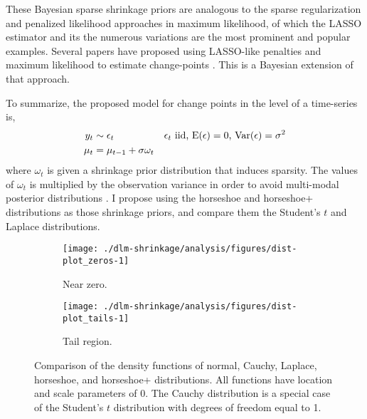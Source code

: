 \documentclass[12pt]{article}
\begin{document}
These Bayesian sparse shrinkage priors are analogous to the sparse regularization and penalized likelihood approaches in maximum likelihood, of which the LASSO estimator \parencite{Tibshirani1996} and its the numerous variations are the most prominent and popular examples.
Several papers have proposed using LASSO-like penalties and maximum likelihood to estimate change-points \parencites{TibshiraniEtAl2005}{HarchaouiLevy-Leduc2010}{ChanYauZhang2014}.
This is a Bayesian extension of that approach.

To summarize, the proposed model for change points in the level of a time-series is,
\begin{align}
  \label{dlm:eq:16}
  y_{t} & \sim \epsilon_{t} & \text{$\epsilon_{t}$ iid, $\operatorname{E}(\epsilon) = 0$, $\operatorname{Var}(\epsilon) = \sigma^{2}$} \\
  \mu_{t} &= \mu_{t - 1} + \sigma \omega_{t}
\end{align}
where $\omega_{t}$ is given a shrinkage prior distribution that induces sparsity.
The values of $\omega_{t}$ is multiplied by the observation variance in order to avoid multi-modal posterior distributions \parencite[8]{PolsonScott2010}.
I propose using the horseshoe and horseshoe+ distributions as those shrinkage priors, and compare them the Student's $t$ and Laplace distributions.

\begin{figure}[!htpb]
 \begin{subfigure}[b]{\linewidth}
   \texttt{[image: ./dlm-shrinkage/analysis/figures/dist-plot\_zeros-1]}
   \caption{Near zero.}
 \end{subfigure}
 \begin{subfigure}[b]{\linewidth}
    \texttt{[image: ./dlm-shrinkage/analysis/figures/dist-plot\_tails-1]}
    \caption{Tail region.}
 \end{subfigure}
  \caption[Comparison of the density functions of normal, Cauchy, Laplace, horseshoe, and horseshoe+ distributions.]{
    Comparison of the density functions of normal, Cauchy, Laplace, horseshoe, and horseshoe+ distributions.
    All functions have location and scale parameters of 0.
    The Cauchy distribution is a special case of the Student's $t$ distribution with degrees of freedom equal to 1.
  }
  \label{dlm:fig:density}
\end{figure}
\end{document}
